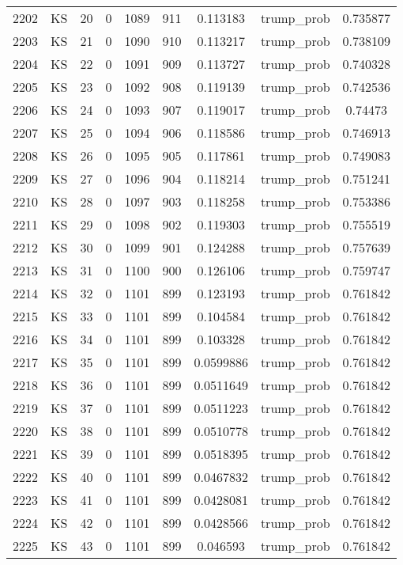 \documentclass[12pt,a4paper]{article}
\begin{document}
\begin{tabular}{r|cccccccc}
	2202 & KS & 20 & 0 & 1089 & 911 & 0.113183 & trump\_prob & 0.735877 \\
	2203 & KS & 21 & 0 & 1090 & 910 & 0.113217 & trump\_prob & 0.738109 \\
	2204 & KS & 22 & 0 & 1091 & 909 & 0.113727 & trump\_prob & 0.740328 \\
	2205 & KS & 23 & 0 & 1092 & 908 & 0.119139 & trump\_prob & 0.742536 \\
	2206 & KS & 24 & 0 & 1093 & 907 & 0.119017 & trump\_prob & 0.74473 \\
	2207 & KS & 25 & 0 & 1094 & 906 & 0.118586 & trump\_prob & 0.746913 \\
	2208 & KS & 26 & 0 & 1095 & 905 & 0.117861 & trump\_prob & 0.749083 \\
	2209 & KS & 27 & 0 & 1096 & 904 & 0.118214 & trump\_prob & 0.751241 \\
	2210 & KS & 28 & 0 & 1097 & 903 & 0.118258 & trump\_prob & 0.753386 \\
	2211 & KS & 29 & 0 & 1098 & 902 & 0.119303 & trump\_prob & 0.755519 \\
	2212 & KS & 30 & 0 & 1099 & 901 & 0.124288 & trump\_prob & 0.757639 \\
	2213 & KS & 31 & 0 & 1100 & 900 & 0.126106 & trump\_prob & 0.759747 \\
	2214 & KS & 32 & 0 & 1101 & 899 & 0.123193 & trump\_prob & 0.761842 \\
	2215 & KS & 33 & 0 & 1101 & 899 & 0.104584 & trump\_prob & 0.761842 \\
	2216 & KS & 34 & 0 & 1101 & 899 & 0.103328 & trump\_prob & 0.761842 \\
	2217 & KS & 35 & 0 & 1101 & 899 & 0.0599886 & trump\_prob & 0.761842 \\
	2218 & KS & 36 & 0 & 1101 & 899 & 0.0511649 & trump\_prob & 0.761842 \\
	2219 & KS & 37 & 0 & 1101 & 899 & 0.0511223 & trump\_prob & 0.761842 \\
	2220 & KS & 38 & 0 & 1101 & 899 & 0.0510778 & trump\_prob & 0.761842 \\
	2221 & KS & 39 & 0 & 1101 & 899 & 0.0518395 & trump\_prob & 0.761842 \\
	2222 & KS & 40 & 0 & 1101 & 899 & 0.0467832 & trump\_prob & 0.761842 \\
	2223 & KS & 41 & 0 & 1101 & 899 & 0.0428081 & trump\_prob & 0.761842 \\
	2224 & KS & 42 & 0 & 1101 & 899 & 0.0428566 & trump\_prob & 0.761842 \\
	2225 & KS & 43 & 0 & 1101 & 899 & 0.046593 & trump\_prob & 0.761842 \\

\end{tabular}
\end{document}
